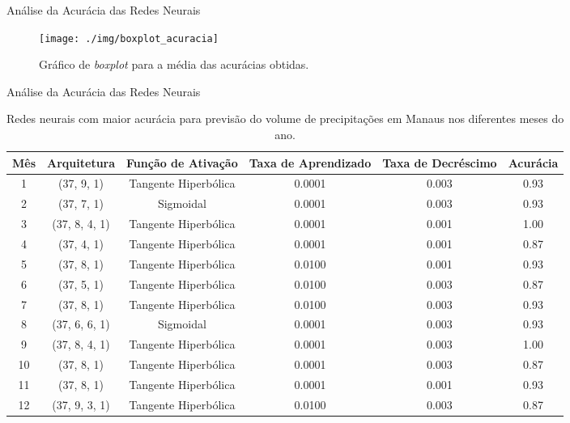 \begin{frame}[b]{Análise da Acurácia das Redes Neurais}
	\begin{figure}
		\texttt{[image: ./img/boxplot\_acuracia]}
		\caption{Gráfico de \emph{boxplot} para a média das acurácias obtidas.}
		 \label{fig:boxplotResultados}

	\end{figure}
\end{frame}
\begin{frame}{Análise da Acurácia das Redes Neurais}
	\begin{table}[H]
  \centering
  \begin{adjustbox}{width=1\textwidth}
  \begin{tabular}{cccccc}
    \toprule
    \textbf{Mês} &  \textbf{Arquitetura} & \textbf{Função de Ativação} &  \textbf{Taxa de Aprendizado} &   \textbf{Taxa de Decréscimo} &  \textbf{Acurácia} \\
    \midrule
    1 &     (37, 9, 1) &  Tangente Hiperbólica &  0.0001 &  0.003 &      0.93 \\
    2 &     (37, 7, 1) &             Sigmoidal &  0.0001 &  0.003 &      0.93 \\
    3 &  (37, 8, 4, 1) &  Tangente Hiperbólica &  0.0001 &  0.001 &      1.00 \\
    4 &     (37, 4, 1) &  Tangente Hiperbólica &  0.0001 &  0.001 &      0.87 \\
    5 &     (37, 8, 1) &  Tangente Hiperbólica &  0.0100 &  0.001 &      0.93 \\
    6 &     (37, 5, 1) &  Tangente Hiperbólica &  0.0100 &  0.003 &      0.87 \\
    7 &     (37, 8, 1) &  Tangente Hiperbólica &  0.0100 &  0.003 &      0.93 \\
    8 &  (37, 6, 6, 1) &             Sigmoidal &  0.0001 &  0.003 &      0.93 \\
    9 &  (37, 8, 4, 1) &  Tangente Hiperbólica &  0.0001 &  0.003 &      1.00 \\
    10 &     (37, 8, 1) &  Tangente Hiperbólica &  0.0001 &  0.003 &      0.87 \\
    11 &     (37, 8, 1) &  Tangente Hiperbólica &  0.0001 &  0.001 &      0.93 \\
    12 &  (37, 9, 3, 1) &  Tangente Hiperbólica &  0.0100 &  0.003 &      0.87 \\
    \bottomrule
  \end{tabular}
\end{adjustbox}
\caption{Redes neurais com maior acurácia para previsão do volume de precipitações em Manaus nos diferentes meses do ano.} \label{tab:melhores}
\end{table}
\end{frame}
